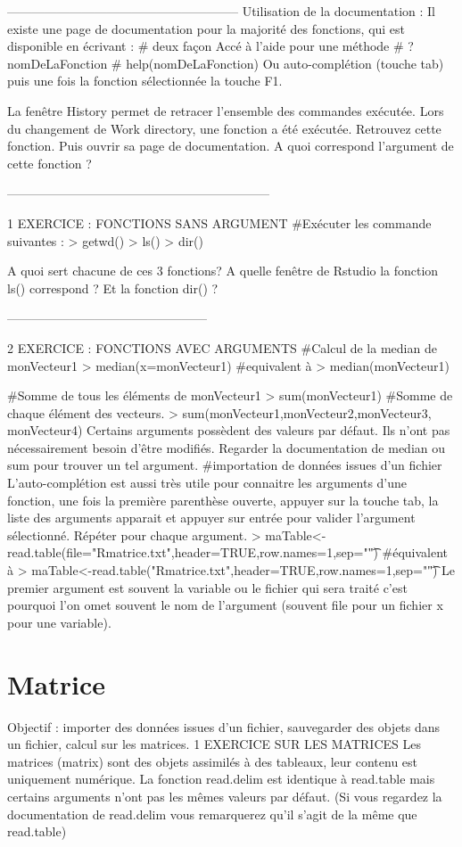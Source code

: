 --------------------------------------------------------
Utilisation de la documentation :
Il existe une page de documentation pour la majorité des fonctions, qui est disponible en écrivant :
\# deux façon Accé à l'aide pour une méthode
\# ?nomDeLaFonction 
  \#  help(nomDeLaFonction) 
 Ou auto-complétion (touche tab) puis une fois la fonction sélectionnée la touche F1.

La fenêtre History permet de retracer l'ensemble des commandes exécutée.  Lors du changement de Work directory, une fonction a été exécutée.  Retrouvez cette fonction. Puis ouvrir sa page de documentation.
A quoi correspond l'argument de cette fonction ?

---------------------------------------------------------------

1	EXERCICE : FONCTIONS SANS ARGUMENT 
\#Exécuter les commande suivantes :
> getwd() 	
> ls() 	
> dir() 	

A quoi sert chacune de ces 3 fonctions? A quelle fenêtre de Rstudio la fonction ls() correspond ? Et la fonction dir() ?


------------------------------------------------

2	EXERCICE : FONCTIONS AVEC ARGUMENTS
\#Calcul de la median de monVecteur1
> median(x=monVecteur1)
\#equivalent à
> median(monVecteur1)

\#Somme de tous les éléments de monVecteur1
> sum(monVecteur1)
\#Somme de chaque élément des vecteurs.
> sum(monVecteur1,monVecteur2,monVecteur3, monVecteur4)
Certains arguments possèdent des valeurs par défaut. Ils n'ont pas nécessairement besoin d'être modifiés.
Regarder la documentation de median ou sum pour trouver un tel argument.
\#importation de données issues d'un fichier
L'auto-complétion est aussi très utile pour connaitre les arguments d'une fonction, une fois la première parenthèse ouverte,  appuyer sur la touche tab, la liste des arguments apparait et appuyer sur entrée pour valider l'argument sélectionné. Répéter pour chaque argument.
> maTable<-read.table(file="Rmatrice.txt",header=TRUE,row.names=1,sep="\t")
\#équivalent à 
> maTable<-read.table("Rmatrice.txt",header=TRUE,row.names=1,sep="\t")
Le premier argument est souvent la variable ou le fichier qui sera traité c'est pourquoi l'on omet souvent le nom de l'argument (souvent file pour un fichier x pour une variable).
\section{Matrice}
Objectif : importer des données issues d'un fichier, sauvegarder des objets dans un fichier, calcul sur les matrices.
1	EXERCICE SUR LES MATRICES
Les matrices (matrix) sont des objets assimilés à des tableaux, leur contenu est uniquement numérique.
La fonction read.delim est identique à read.table mais certains arguments n'ont pas les mêmes valeurs par défaut. (Si vous regardez la documentation de read.delim vous remarquerez qu'il s'agit de la même que read.table)

